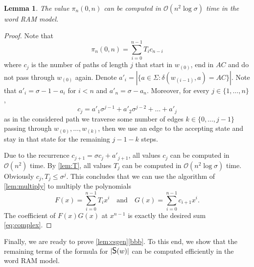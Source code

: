 \documentclass{article}
\newcommand{\Oh}{\mathcal{O}}
\newcommand{\CS}{\mbox{\large{\sf{S}}}}
\newtheorem{lemma}[theorem]{Lemma}
\theoremstyle{definition}
\theoremstyle{remark}
\begin{document}
\begin{lemma}\label{lem:complex}
  The value $\pi_n(0,n)$ can be computed in $\Oh(n^2 \log \sigma)$ time in the word RAM model.
\end{lemma}
\begin{proof}
  Note that
  \begin{equation}\label{eq:complex}
    \pi_n(0,n) = \sum_{i=0}^{n-1} T_i c_{n-i}
  \end{equation}
  where $c_j$ is the number of paths of length $j$ that start in $w_{(0)}$, end in $AC$ and do not pass through $w_{(0)}$ again.
  Denote $a'_i=|\{a \in \Sigma : \delta(w_{(i-1)}, a) = AC\}|$. Note that $a'_i = \sigma-1-a_i$ for $i < n$ and $a'_n = \sigma-a_n$.
  Moreover, for every $j\in\{1,\ldots,n\}$,
  $$c_j=a'_1\sigma^{j-1}+a'_2\sigma^{j-2}+\ldots+a'_j$$
  as in the considered path we traverse some number of edges $k \in \{0,\ldots,j-1\}$ passing through $w_{(0)},\ldots,w_{(k)}$,
  then we use an edge to the accepting state and stay in that state for the remaining $j-1-k$ steps.

  Due to the recurrence $c_{j+1}=\sigma c_j+a'_{j+1}$, all values $c_j$ can be computed in $\Oh(n^2)$ time.
  By \cref{lem:T}, all values $T_j$ can be computed in $\Oh(n^2 \log \sigma)$ time.
  Obviously $c_j, T_j \le \sigma^j$.
  This concludes that we can use the algorithm of \cref{lem:multiply} to multiply
  the polynomials
  $$F(x)=\sum_{i=0}^{n-1} T_i x^i \quad\mbox{and}\quad G(x)=\sum_{i=0}^{n-1} c_{i+1}x^i.$$
  The coefficient of $F(x)G(x)$ at $x^{n-1}$ is exactly the desired sum \eqref{eq:complex}.
\end{proof}

Finally, we are ready to prove \cref{lem:csgen}\ref{bbb}. To this end, we show that the remaining terms of the formula for $|\CS(w)|$ can be computed efficiently in the word RAM model.
\end{document}
